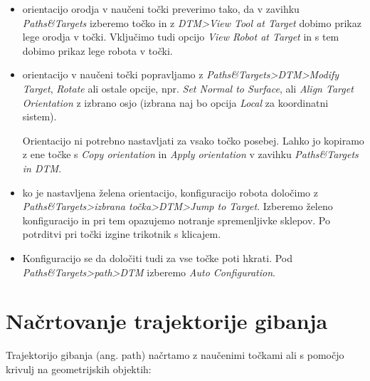 \begin{enumerate}
\begin{itemize}
    \item orientacijo orodja v naučeni točki preverimo tako, da v zavihku \emph{Paths\&Targets} izberemo točko in z \emph{DTM>View Tool at Target} dobimo prikaz lege orodja v točki. Vključimo tudi opcijo \emph{View Robot at Target} in s tem dobimo prikaz lege robota v točki.

    \item  orientacijo v naučeni točki  popravljamo z \emph{Paths\&Targets>DTM>Modify Target}, \emph{Rotate} ali ostale opcije, npr. \emph{Set Normal to Surface}, ali \emph{Align Target Orientation} z izbrano
    osjo (izbrana naj bo opcija \emph{Local} za koordinatni sistem).

    Orientacijo ni potrebno nastavljati za vsako točko posebej. Lahko jo kopiramo z ene točke s \emph{Copy orientation} in \emph{Apply orientation} v zavihku \emph{Paths\&Targets in
    DTM}.

    \item ko je nastavljena želena orientacijo, konfiguracijo robota določimo z \newline \emph{Paths\&Targets>izbrana točka>DTM>Jump to Target}. Izberemo želeno konfiguracijo in pri tem opazujemo notranje spremenljivke sklepov. Po potrditvi pri točki izgine trikotnik s klicajem.

\item Konfiguracijo se da določiti tudi za vse točke poti hkrati. Pod
\emph{Paths\&Targets>path>DTM} izberemo \emph{Auto Configuration}.
\end{itemize}
\end{enumerate}


\section{Načrtovanje trajektorije gibanja}

Trajektorijo gibanja (ang. path) načrtamo z naučenimi točkami ali s pomočjo
krivulj na geometrijskih objektih:


